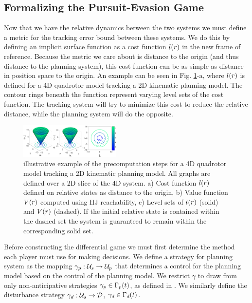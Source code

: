 \subsection{Formalizing the Pursuit-Evasion Game}
Now that we have the relative dynamics between the two systems we must define a metric for the tracking error bound between these systems. We do this by defining an implicit surface function as a cost function $l(r)$ in the new frame of reference. Because the metric we care about is distance to the origin (and thus distance to the planning system), this cost function can be as simple as distance in position space to the origin. An example can be seen in Fig. \ref{fig:quad4D_example}-a, where $l(r)$ is defined for a 4D quadrotor model tracking a 2D kinematic planning model. The contour rings beneath the function represent varying level sets of the cost function. The tracking system will try to minimize this cost to reduce the relative distance, while the planning system will do the opposite.
\begin{figure}
	\centering
	\includegraphics[width=0.45\textwidth]{fig/quad4D_example}
	\caption{illustrative example of the precomputation steps for a 4D quadrotor model tracking a 2D kinematic planning model. All graphs are defined over a 2D slice of the 4D system. a) Cost function $l(r)$ defined on relative states as distance to the origin, b) Value function $V(r)$ computed using HJ reachability, c) Level sets of $l(r)$ (solid) and $V(r)$ (dashed). If the initial relative state is contained within the dashed set the system is guaranteed to remain within the corresponding solid set.}
	\label{fig:quad4D_example}
	\vspace{-.2in}
\end{figure} 

Before constructing the differential game we must first determine the method each player must use for making decisions. We define a strategy for planning system as the mapping $\gamma_{p} : \mathcal{U}_s \rightarrow \mathcal{U}_p$ that determines a control for the planning model based on the control of the planning model. We restrict $\gamma$ to draw from only non-anticipative strategies $\gamma_{p} \in \Gamma_p(t)$, as defined in \cite{Mitchell05}. We similarly define the disturbance strategy $\gamma_{d}: \mathcal{U}_s \rightarrow \mathcal{D}$, $\gamma_{d} \in \Gamma_d(t)$.

